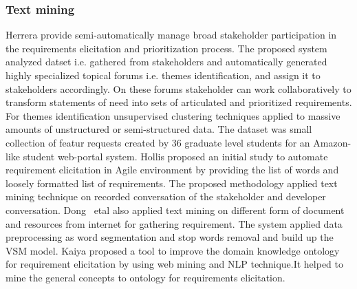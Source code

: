 \subsubsection{Text mining} 
 Herrera \etal \cite{Castro-Herrera:2009} provide semi-automatically manage broad stakeholder participation in the requirements elicitation and prioritization process. 
The proposed system analyzed datset i.e. gathered from stakeholders and automatically generated highly specialized topical forums i.e. themes identification, and assign it to stakeholders accordingly.
On these forums stakeholder can work collaboratively to transform statements of need into sets of articulated and prioritized requirements. For themes identification unsupervised clustering
techniques applied to massive amounts of unstructured or semi-structured data. The dataset was  small collection of featur requests created by 36 graduate level students for an Amazon-like student web-portal system. Hollis \etal \cite{Hollis2017} proposed an initial study to automate requirement elicitation in Agile environment by providing the list of
words and loosely formatted list of requirements. The proposed methodology
applied text mining technique on recorded conversation of the stakeholder and
developer conversation. Dong ~etal \cite{dong2010} also applied text mining on
different form of document and resources from internet for gathering
requirement. The system applied data preprocessing as word segmentation and stop
words removal and build up the VSM model. Kaiya \etal \cite {Kaiya:2010} proposed a
tool to improve the domain knowledge ontology for requirement elicitation by using web mining and NLP
technique.It helped to mine the general
concepts to ontology for requirements elicitation.


